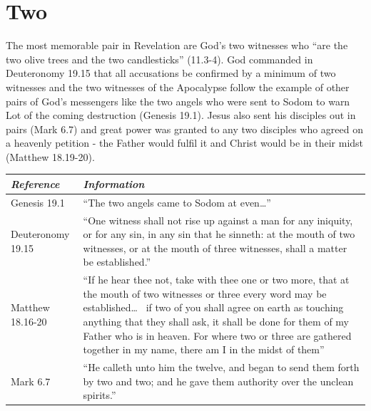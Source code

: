 \section*{Two}
The most memorable pair in Revelation are God's two witnesses who ``are the two olive trees and the two candlesticks'' (11.3-4). God commanded in Deuteronomy 19.15 that all accusations be confirmed by a minimum of two witnesses and the two witnesses of the Apocalypse follow the example of other pairs of God's messengers like the two angels who were sent to Sodom to warn Lot of the coming destruction (Genesis 19.1). Jesus also sent his disciples out in pairs (Mark 6.7) and great power was granted to any two disciples who agreed on a heavenly petition - the Father would fulfil it and Christ would be in their midst (Matthew 18.19-20).  
\newline\newline
\begin{tabularx}{\textwidth}{l X}
\toprule
\rowcolor{headergray}\emph{Reference} & \emph{Information}\\ 
\midrule
Genesis 19.1 & ``The two angels came to Sodom at even\ldots'' \\
\addlinespace
Deuteronomy 19.15 & ``One witness shall not rise up against a man for any iniquity, or for any sin, in any sin that he sinneth: at the mouth of two witnesses, or at the mouth of three witnesses, shall a matter be established.'' \\
\addlinespace
Matthew 18.16-20 & ``If he hear thee not, take with thee one or two more, that at the mouth of two witnesses or three every word may be established\ldots~ if two of you shall agree on earth as touching anything that they shall ask, it shall be done for them of my Father who is in heaven. For where two or three are gathered together in my name, there am I in the midst of them'' \\
\addlinespace
Mark 6.7 & ``He calleth unto him the twelve, and began to send them forth by two and two; and he gave them authority over the unclean spirits.'' \\
\bottomrule
\end{tabularx}

